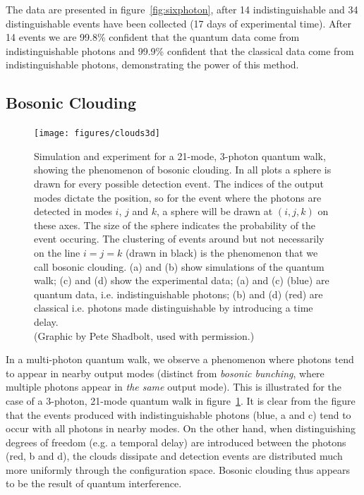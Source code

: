 The data are presented in figure~\ref{fig:sixphoton}, after 14 indistinguishable
and 34 distinguishable events have been collected (17 days of experimental
time). After 14 events we are 99.8\% confident that the quantum data come from
indistinguishable photons and 99.9\% confident that the classical data come
from indistinguishable photons, demonstrating the power of this method.

\subsection{Bosonic Clouding}
\label{sec:Clouding}
\begin{figure}[p]
  \centering
  \texttt{[image: figures/clouds3d]}
  \caption[Bosonic clouding in a quantum walk]
  {Simulation and experiment for a 21-mode, 3-photon quantum walk, showing the
  phenomenon of bosonic clouding. In all plots a sphere is drawn for every
  possible detection event. The indices of the output modes dictate the
  position, so for the event where the photons are detected in modes \(i\),
  \(j\) and \(k\), a sphere will be drawn at \(\left(i,j,k\right)\) on these
  axes. The size of the sphere indicates the probability of the event occuring. 
  The clustering of events around but not necessarily on the line \(i=j=k\)
  (drawn in black) is the phenomenon that we call bosonic clouding.
  (a) and (b) show simulations of the quantum walk; (c) and (d) show the
  experimental data; (a) and (c) (blue) are quantum data, i.e. indistinguishable
  photons; (b) and (d) (red) are classical i.e. photons made distinguishable by
  introducing a time delay.\\
  (Graphic by Pete Shadbolt, used with permission.)}
  \label{fig:clouds3d}
\end{figure}
In a multi-photon quantum walk, we observe a phenomenon where photons tend to
appear in nearby output modes (distinct from \emph{bosonic bunching},
where multiple photons appear in \emph{the same} output mode). This is
illustrated for the case of a 3-photon, 21-mode quantum walk in
figure~\ref{fig:clouds3d}. It is clear from the figure that the events produced
with indistinguishable photons (blue, a and c) tend to occur with all photons
in nearby modes. On the other hand, when distinguishing degrees of freedom
(e.g. a temporal delay) are introduced between the photons (red, b and d), the
clouds dissipate and detection events are distributed much more uniformly
through the configuration space. Bosonic clouding thus appears to be the result
of quantum interference.

